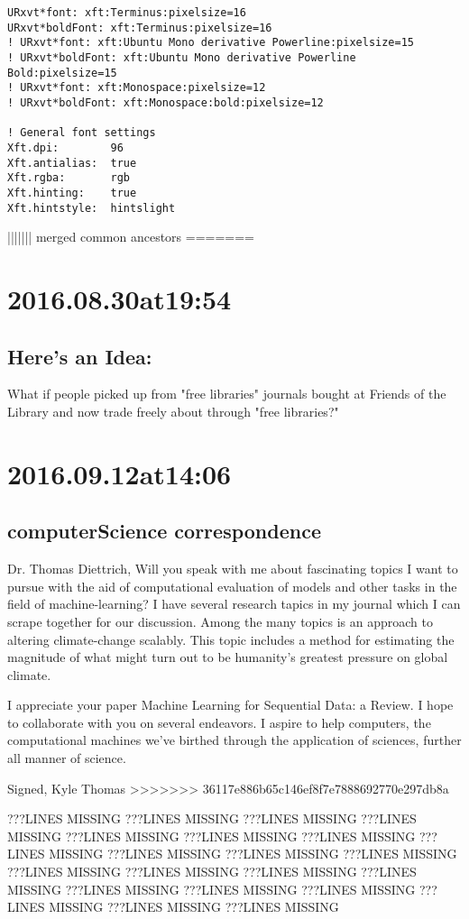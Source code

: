\begin{enumerate}
\begin{enumerate}
\begin{lstlisting}
URxvt*font: xft:Terminus:pixelsize=16
URxvt*boldFont: xft:Terminus:pixelsize=16
! URxvt*font: xft:Ubuntu Mono derivative Powerline:pixelsize=15
! URxvt*boldFont: xft:Ubuntu Mono derivative Powerline Bold:pixelsize=15
! URxvt*font: xft:Monospace:pixelsize=12
! URxvt*boldFont: xft:Monospace:bold:pixelsize=12

! General font settings
Xft.dpi:        96
Xft.antialias:  true
Xft.rgba:       rgb
Xft.hinting:    true
Xft.hintstyle:  hintslight
\end{lstlisting}
||||||| merged common ancestors
=======

\section*{ 2016.08.30at19:54 }
\subsection*{Here's an Idea:}
What if people picked up from "free libraries" journals bought at Friends of the Library and now trade freely about through "free libraries?"

\section*{ 2016.09.12at14:06 }
\subsection*{computerScience correspondence}
Dr. Thomas Diettrich,
Will you speak with me about fascinating topics I want to pursue with the aid of computational evaluation of models and other tasks in the field of machine-learning? I have several research tapics in my journal which I can scrape together for our discussion. Among the many topics is an approach to altering climate-change scalably. This topic includes a method for estimating the magnitude of what might turn out to be humanity's greatest pressure on global climate.

I appreciate your paper Machine Learning for Sequential Data: a Review. I hope to collaborate with you on several endeavors. I aspire to help computers, the computational machines we've birthed through the application of sciences, further all manner of science.

Signed,
Kyle Thomas
>>>>>>> 36117e886b65c146ef8f7e7888692770e297db8a

???LINES MISSING
???LINES MISSING
???LINES MISSING
???LINES MISSING
???LINES MISSING
???LINES MISSING
???LINES MISSING
???LINES MISSING
???LINES MISSING
???LINES MISSING
???LINES MISSING
???LINES MISSING
???LINES MISSING
???LINES MISSING
???LINES MISSING
???LINES MISSING
???LINES MISSING
???LINES MISSING
???LINES MISSING
???LINES MISSING
???LINES MISSING


\end{enumerate}
\end{enumerate}
